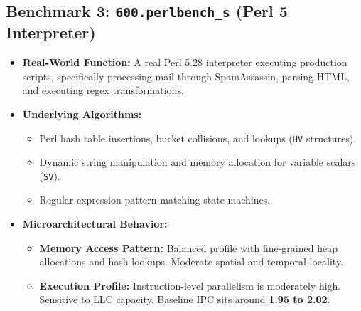\documentclass[11pt, a4paper]{article}
\begin{document}
\subsection{Benchmark 3: \texttt{600.perlbench\_s} (Perl 5 Interpreter)}
\begin{itemize}[leftmargin=1.5em]
  \item \textbf{Real-World Function:} A real Perl 5.28 interpreter executing production scripts, specifically processing mail through SpamAssassin, parsing HTML, and executing regex transformations.
  \item \textbf{Underlying Algorithms:}
  \begin{itemize}
    \item Perl hash table insertions, bucket collisions, and lookups (\texttt{HV} structures).
    \item Dynamic string manipulation and memory allocation for variable scalars (\texttt{SV}).
    \item Regular expression pattern matching state machines.
  \end{itemize}
  \item \textbf{Microarchitectural Behavior:}
  \begin{itemize}
    \item \textbf{Memory Access Pattern:} Balanced profile with fine-grained heap allocations and hash lookups. Moderate spatial and temporal locality.
    \item \textbf{Execution Profile:} Instruction-level parallelism is moderately high. Sensitive to LLC capacity. Baseline IPC sits around \textbf{1.95 to 2.02}.
  \end{itemize}
\end{itemize}
\end{document}
